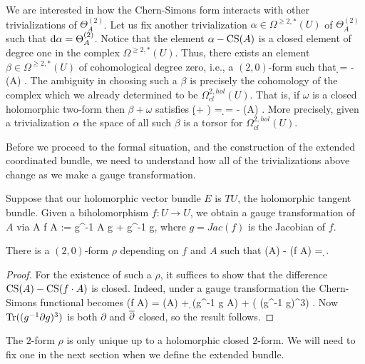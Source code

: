 We are interested in how the Chern-Simons form interacts with other trivializations of $\Theta^{(2)}_A$. 
Let us fix another trivialization $\alpha \in \Omega^{\geq 2, *} (U)$ of $\Theta^{(2)}_A$ 
such that ${\rm d} \alpha = \Theta^{(2)}_A$. 
Notice that the element $\alpha - {\rm CS}(A)$ is a closed element of degree one in the complex $\Omega^{\geq 2, *} (U)$. 
Thus, there exists an element $\beta \in \Omega^{\geq 2, *} (U)$ of cohomological degree zero, i.e., a $(2,0)$-form
such that
\ben
\d \beta = \alpha - \CS (A) .
\een
The ambiguity in choosing such a $\beta$ is precisely the cohomology
of the complex which we already determined to be
$\Omega^{2,hol}_{cl}(U)$. That is, if $\omega$ is a closed holomorphic
two-form then $\beta + \omega$ satisfies 
\ben
\d (\beta + \omega) = \d \beta = \alpha - \CS (A) .
\een
More precisely, given a trivialization $\alpha$ the space of all such $\beta$ is a torsor for
$\Omega^{2,hol}_{cl}(U)$. 

Before we proceed to the formal situation, and the construction of the extended coordinated bundle, 
we need to understand how all of the trivializations above change as we make a gauge transformation. 

Suppose that our holomorphic vector bundle $E$ is $TU$, the holomorphic tangent bundle. 
Given a biholomorphism $f : U \to U$, we obtain a gauge transformation of $A$ via
\ben
A \mapsto f \cdot A := g^{-1} A g + g^{-1} \partial g,
\een
where $g = Jac(f)$ is the Jacobian of $f$. 

\begin{lemma}\label{cs formula} 
There is a $(2,0)$-form $\rho$ depending on $f$ and $A$ such that
\ben
\CS(A) - \CS(f \cdot A) = \d \rho.
\een 
\end{lemma}

\begin{proof} 
For the existence of such a $\rho$, it suffices
to show that the difference ${\rm CS}(A) - {\rm CS}(f \cdot A)$ is closed. Indeed, under a gauge
transformation the Chern-Simons
functional becomes
\ben
\CS(f \cdot A) = \CS(A) + \d \Tr(g^{-1} \partial g \wedge A) + 
\Tr\left( (g^{-1} \partial g)^3\right) .
\een
Now ${\rm Tr}((g^{-1} \partial g)^3)$ is both $\partial$ and $\overline{\partial}$
closed, so the result follows.
\end{proof}

\begin{rmk} The $2$-form $\rho$ is only unique up to a holomorphic closed
$2$-form. We will need to fix one in the next section when we define
the extended bundle.
\end{rmk}

